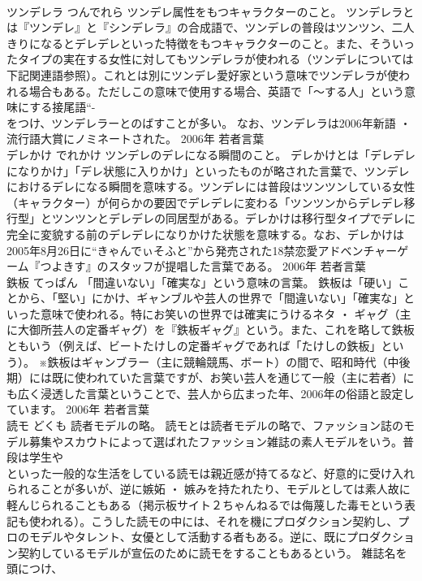 \documentclass[8pt]{extreport}
\begin{document}
\begin{CJK}{UTF8}{min}
\\	ツンデレラ	つんでれら	ツンデレ属性をもつキャラクターのこと。	ツンデレラとは『ツンデレ』と『シンデレラ』の合成語で、ツンデレの普段はツンツン、二人きりになるとデレデレといった特徴をもつキャラクターのこと。また、そういったタイプの実在する女性に対してもツンデレラが使われる（ツンデレについては下記関連語参照）。これとは別にツンデレ愛好家という意味でツンデレラが使われる場合もある。ただしこの意味で使用する場合、英語で「～する人」という意味にする接尾語“-
\\	をつけ、ツンデレラーとのばすことが多い。 なお、ツンデレラは2006年新語 ・ 流行語大賞にノミネートされた。	2006年	若者言葉	
\\	デレかけ	でれかけ	ツンデレのデレになる瞬間のこと。	デレかけとは「デレデレになりかけ」「デレ状態に入りかけ」といったものが略された言葉で、ツンデレにおけるデレになる瞬間を意味する。ツンデレには普段はツンツンしている女性（キャラクター）が何らかの要因でデレデレに変わる「ツンツンからデレデレ移行型」とツンツンとデレデレの同居型がある。デレかけは移行型タイプでデレに完全に変貌する前のデレデレになりかけた状態を意味する。なお、デレかけは2005年8月26日に“きゃんでぃそふと”から発売された18禁恋愛アドベンチャーゲーム『つよきす』のスタッフが提唱した言葉である。	2006年	若者言葉	
\\	鉄板	てっぱん	「間違いない」「確実な」という意味の言葉。	鉄板は「硬い」ことから、「堅い」にかけ、ギャンブルや芸人の世界で「間違いない」「確実な」といった意味で使われる。特にお笑いの世界では確実にうけるネタ ・ ギャグ（主に大御所芸人の定番ギャグ）を『鉄板ギャグ』という。また、これを略して鉄板ともいう（例えば、ビートたけしの定番ギャグであれば「たけしの鉄板」という）。 ※鉄板はギャンブラー（主に競輪競馬、ボート）の間で、昭和時代（中後期）には既に使われていた言葉ですが、お笑い芸人を通じて一般（主に若者）にも広く浸透した言葉ということで、芸人から広まった年、2006年の俗語と設定しています。	2006年	若者言葉	
\\	読モ	どくも	読者モデルの略。	読モとは読者モデルの略で、ファッション誌のモデル募集やスカウトによって選ばれたファッション雑誌の素人モデルをいう。普段は学生や
\\	といった一般的な生活をしている読モは親近感が持てるなど、好意的に受け入れられることが多いが、逆に嫉妬 ・ 嫉みを持たれたり、モデルとしては素人故に軽んじられることもある（掲示板サイト２ちゃんねるでは侮蔑した毒モという表記も使われる）。こうした読モの中には、それを機にプロダクション契約し、プロのモデルやタレント、女優として活動する者もある。逆に、既にプロダクション契約しているモデルが宣伝のために読モをすることもあるという。 雑誌名を頭につけ、

\end{CJK}
\end{document}
